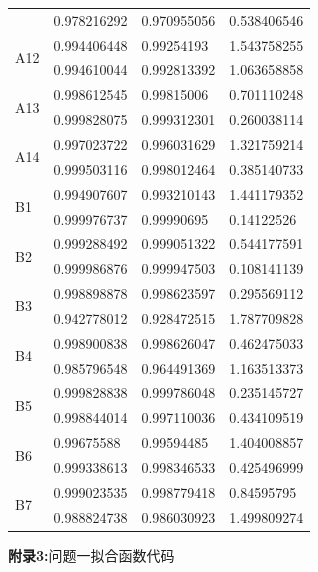 \documentclass[a4paper,10.5pt]{ctexart}
\begin{document}
\begin{longtable}{p{2cm}p{4cm}p{4cm}p{4cm}}
          & 0.978216292 & 0.970955056 & 0.538406546 \\
    \multirow{2}[0]{*}{A12} & 0.994406448 & 0.99254193 & 1.543758255 \\
          & 0.994610044 & 0.992813392 & 1.063658858 \\
    \multirow{2}[0]{*}{A13} & 0.998612545 & 0.99815006 & 0.701110248 \\
          & 0.999828075 & 0.999312301 & 0.260038114 \\
    \multirow{2}[0]{*}{A14} & 0.997023722 & 0.996031629 & 1.321759214 \\
          & 0.999503116 & 0.998012464 & 0.385140733 \\
    \multirow{2}[0]{*}{B1} & 0.994907607 & 0.993210143 & 1.441179352 \\
          & 0.999976737 & 0.99990695 & 0.14122526 \\
    \multirow{2}[0]{*}{B2} & 0.999288492 & 0.999051322 & 0.544177591 \\
          & 0.999986876 & 0.999947503 & 0.108141139 \\
    \multirow{2}[0]{*}{B3} & 0.998898878 & 0.998623597 & 0.295569112 \\
          & 0.942778012 & 0.928472515 & 1.787709828 \\
    \multirow{2}[0]{*}{B4} & 0.998900838 & 0.998626047 & 0.462475033 \\
          & 0.985796548 & 0.964491369 & 1.163513373 \\
    \multirow{2}[0]{*}{B5} & 0.999828838 & 0.999786048 & 0.235145727 \\
          & 0.998844014 & 0.997110036 & 0.434109519 \\
    \multirow{2}[0]{*}{B6} & 0.99675588 & 0.99594485 & 1.404008857 \\
          & 0.999338613 & 0.998346533 & 0.425496999 \\
    \multirow{2}[1]{*}{B7} & 0.999023535 & 0.998779418 & 0.84595795 \\
          & 0.988824738 & 0.986030923 & 1.499809274 \\
\hline
\end{longtable}
\clearpage
\noindent \textbf{ 附录3:}问题一拟合函数代码
\end{document}
